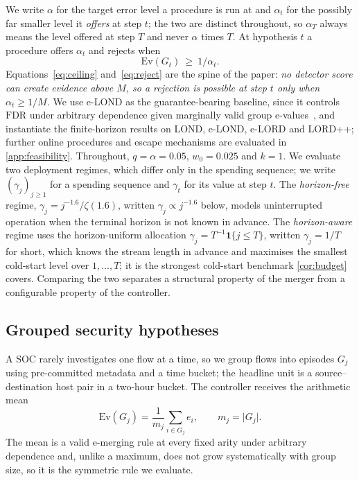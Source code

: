 \documentclass[conference]{IEEEtran}
\newcommand{\ceil}{M}
\newcommand{\alphat}{\alpha_t}
\newcommand{\Ev}{\mathrm{Ev}}
\newcommand{\FDR}{\mathrm{FDR}}
\begin{document}
We write $\alpha$ for the target error level a procedure is run at and $\alphat$ for the possibly far
smaller level it \emph{offers} at step $t$; the two are distinct throughout, so $\alpha_T$ always means
the level offered at step $T$ and never $\alpha$ times $T$. At hypothesis $t$ a procedure offers
$\alphat$ and rejects when
\begin{equation}\label{eq:reject}
\Ev(G_t)\ \ge\ 1/\alphat .
\end{equation}
Equations~\eqref{eq:ceiling} and~\eqref{eq:reject} are the spine of the paper: \emph{no detector score
can create evidence above $\ceil$, so a rejection is possible at step $t$ only when
$\alphat\ge1/\ceil$.} We use e-LOND as the guarantee-bearing baseline, since it controls $\FDR$ under
arbitrary dependence given marginally valid group e-values~\cite{xu2024elond}, and instantiate the
finite-horizon results on LOND, e-LOND, e-LORD and LORD++; further online procedures and escape
mechanisms are evaluated in \cref{app:feasibility}. Throughout, $q=\alpha=0.05$, $w_0=0.025$ and $k=1$.
We evaluate two deployment regimes, which differ only in the spending sequence; we write
$(\gamma_j)_{j\ge1}$ for a spending sequence and $\gamma_t$ for its value at step $t$. The
\emph{horizon-free} regime, $\gamma_j=j^{-1.6}/\zeta(1.6)$, written $\gamma_j\propto j^{-1.6}$ below,
models uninterrupted operation when the terminal horizon is not known in advance. The \emph{horizon-aware} regime uses the horizon-uniform
allocation $\gamma_j=T^{-1}\mathbf 1\{j\le T\}$, written $\gamma_j=1/T$ for short, which knows the
stream length in advance and maximises the smallest cold-start level over $1,\ldots,T$; it is the strongest cold-start benchmark \cref{cor:budget} covers. Comparing the
two separates a structural property of the merger from a configurable property of the controller.

\subsection{Grouped security hypotheses}\label{sec:grouping}

A SOC rarely investigates one flow at a time, so we group flows into episodes $G_j$ using pre-committed
metadata and a time bucket; the headline unit is a source--destination host pair in a two-hour bucket.
The controller receives the arithmetic mean
\begin{equation}\label{eq:mean}
\Ev(G_j)=\frac1{m_j}\sum_{i\in G_j}e_i,\qquad m_j=\lvert G_j\rvert .
\end{equation}
The mean is a valid e-merging rule at every fixed arity under arbitrary dependence and, unlike a
maximum, does not grow systematically with group size, so it is the symmetric rule we evaluate.
\end{document}
